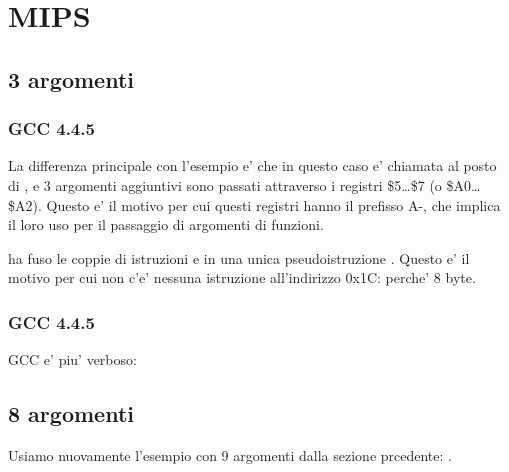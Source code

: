 \section{MIPS}

\subsection{3 argomenti}

\subsubsection{\Optimizing GCC 4.4.5}

La differenza principale con l'esempio \q{\HelloWorldSectionName} e' che in questo caso \printf e' chiamata 
al posto di \puts, e 3 argomenti aggiuntivi sono passati attraverso i registri \$5\dots \$7 (o \$A0\dots \$A2).
Questo e' il motivo per cui questi registri hanno il prefisso A-, che implica il loro uso per il passaggio di argomenti di funzioni.





\IDA ha fuso le coppie di istruzioni  e  in una unica pseudoistruzione .
Questo e' il motivo per cui non c'e' nessuna istruzione all'indirizzo 0x1C: perche'   8 byte.%

\subsubsection{\NonOptimizing GCC 4.4.5}

\NonOptimizing GCC e' piu' verboso:





\subsection{8 argomenti}

Usiamo nuovamente l'esempio con 9 argomenti dalla sezione prcedente: .

